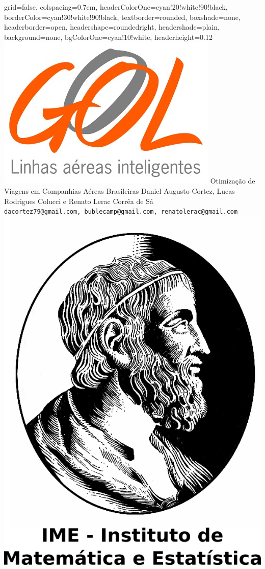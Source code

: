 \documentclass[landscape,a0paper,fontscale=0.292]{baposter}
\begin{document}
\begin{poster}{
grid=false,
colspacing=0.7em,
headerColorOne=cyan!20!white!90!black,
borderColor=cyan!30!white!90!black,
textborder=rounded,
boxshade=none,
headerborder=open,
headershape=roundedright,
headershade=plain,
background=none,
bgColorOne=cyan!10!white,
headerheight=0.12\textheight}
{
 \includegraphics[width=0.08\linewidth]{gol}
}
{
\sc\Huge Otimização de Viagens em Companhias Aéreas Brasileiras
}
{
Daniel Augusto Cortez, Lucas Rodrigues Colucci e Renato Lerac Corrêa de Sá\\[1em]
{\texttt{dacortez79@gmail.com, bublecamp@gmail.com, renatolerac@gmail.com}}
}
{
 \includegraphics[height=0.12\textheight]{logo}
}



\end{poster}
\end{document}
